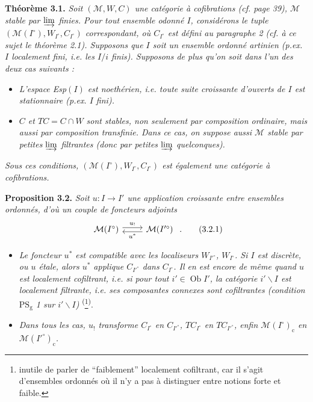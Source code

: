 \documentclass[11pt]{article}
\newcommand{\msp}[1]{\ifstrequal{#1}{page 1}{}{\marginpar{\footnotesize [#1]}}}
\begin{document}
\msp{50}\textbf{Théorème 3.1.} \textit{Soit $(\mathcal{M},W,C)$ une catégorie à cofibrations (cf. page \textup{39}), $\mathcal{M}$ stable par $\varinjlim$ finies. Pour tout ensemble odonné $I$, considérons le tuple $(\mathcal{M}(I^\circ),W_{I^\circ},C_{I^\circ})$ correspondant, où $C_{I^\circ}$ est défini au paragraphe \textup{2} (cf. à ce sujet le théorème \textup{2.1}). Supposons que $I$ soit un ensemble ordonné \textup{artinien} (p.ex. $I$ localement fini, i.e. les $I/i$ finis). Supposons de plus qu'on soit dans l'un des deux cas suivants :} %
\begin{itemize}[leftmargin=2.5em]
\item[a)] \textit{L'espace \textup{Esp}$(I)$ est noethérien, i.e. toute suite croissante d'ouverts de $I$ est stationnaire (p.ex. $I$ fini).}
\item[b)] \textit{$C$ et $TC=C\cap W$ sont stables, non seulement par composition ordinaire, mais aussi par composition transfinie. Dans ce cas, on suppose aussi $\mathcal{M}$ stable par petites $\varinjlim$ filtrantes (donc par petites $\varinjlim$ quelconques).}
\end{itemize}
\textit{Sous ces conditions, $(\mathcal{M}(I^\circ),W_{I^\circ},C_{I^\circ})$ est également une catégorie à cofibrations.}

\textbf{Proposition 3.2.} \textit{Soit $u:I\longrightarrow I'$ une application croissante entre ensembles ordonnés, d'où un couple de foncteurs adjoints}
\[
\begin{tikzcd}
\mathcal{M}(I^\circ) \arrow[r, shift left, "u_{!}"] & \mathcal{M}(I'^\circ) \arrow[l, shift left, "u^*"]
\end{tikzcd}\ .
\tag*{(3.2.1)}
\]
\msp{51}
\begin{itemize}[leftmargin=2.5em]
\item[a)] \textit{Le foncteur $u^*$ est compatible avec les localiseurs $W_{I'^\circ}$, $W_{I^\circ}$. Si $I$ est discrète, ou $u$ étale, alors $u^*$ applique $C_{I'^\circ}$ dans $C_{I^\circ}$. Il en est encore de même quand $u$ est localement cofiltrant, i.e. si pour tout $i'\in\operatorname{Ob}I'$, la catégorie $i'\backslash I$ est localement filtrante, i.e. ses composantes connexes sont cofiltrantes (condition $\mathrm{PS}_{\mathrm{g}}$ \textup{1} sur $i'\backslash I$)} \textsuperscript{(}\footnote[16]{inutile de parler de ``faiblement'' localement cofiltrant, car il s'agit d'ensembles ordonnés où il n'y a pas à distinguer entre notions forte et faible.}\textsuperscript{)}.
\item[b)] \textit{Dans tous les cas, $u_!$ transforme $C_{I^\circ}$ en $C_{I'^\circ}$, $TC_{I^\circ}$ en $TC_{I'^\circ}$, enfin $\mathcal{M}(I^\circ)_{\mathrm{c}}$ en $\mathcal{M}(I'^\circ)_{\mathrm{c}}$.}
\end{itemize}
\end{document}
